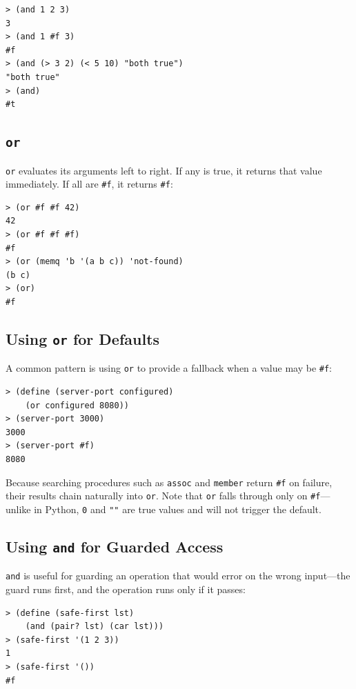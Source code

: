 \begin{lstlisting}[style=repl]
> (and 1 2 3)
3
> (and 1 #f 3)
#f
> (and (> 3 2) (< 5 10) "both true")
"both true"
> (and)
#t
\end{lstlisting}

\subsection{\texttt{or}}

\texttt{or} evaluates its arguments left to right. If any is true, it returns that value immediately. If all are \texttt{\#f}, it returns \texttt{\#f}:

\begin{lstlisting}[style=repl]
> (or #f #f 42)
42
> (or #f #f #f)
#f
> (or (memq 'b '(a b c)) 'not-found)
(b c)
> (or)
#f
\end{lstlisting}

\subsection{Using \texttt{or} for Defaults}

A common pattern is using \texttt{or} to provide a fallback when a value may be \texttt{\#f}:

\begin{lstlisting}[style=repl]
> (define (server-port configured)
    (or configured 8080))
> (server-port 3000)
3000
> (server-port #f)
8080
\end{lstlisting}

Because searching procedures such as \texttt{assoc} and \texttt{member} return \texttt{\#f} on failure, their results chain naturally into \texttt{or}. Note that \texttt{or} falls through only on \texttt{\#f}---unlike in Python, \texttt{0} and \texttt{""} are true values and will not trigger the default.

\subsection{Using \texttt{and} for Guarded Access}

\texttt{and} is useful for guarding an operation that would error on the wrong input---the guard runs first, and the operation runs only if it passes:

\begin{lstlisting}[style=repl]
> (define (safe-first lst)
    (and (pair? lst) (car lst)))
> (safe-first '(1 2 3))
1
> (safe-first '())
#f
\end{lstlisting}

